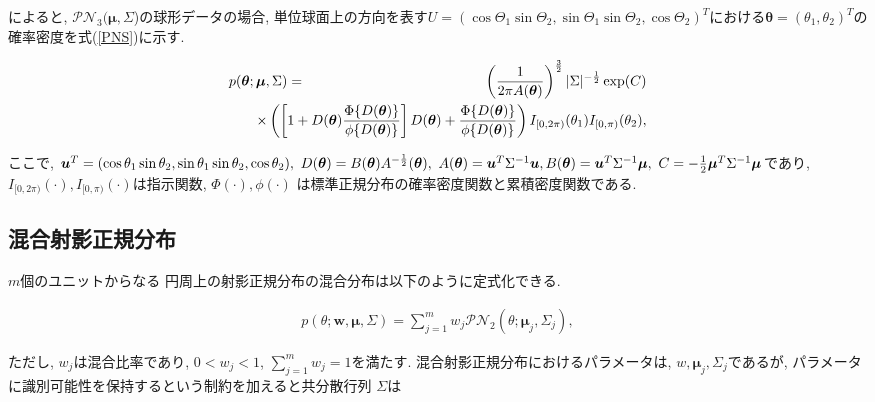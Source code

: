 \documentclass[a4j,12pt]{jarticle}
\begin{document}

\citet{GPN}によると, $\mathcal{PN}_3(\bm \mu,\Sigma$)の球形データの場合, 単位球面上の方向を表す$U = (\cos\Theta_1 \sin \Theta_2, \sin\Theta_1 \sin \Theta_2, \cos \Theta_2)^T$における$\bm \theta = (\theta_1, \theta_2)^T$の確率密度を式(\ref{PNS})に示す.

\begin{eqnarray}
\label{PNS}
p(\bm \theta; \bm \mu, \Sigma) &=& \left(\frac{1}{2\pi A(\bm \theta)}\right)^{\frac{3}{2}} |\Sigma|^{-\frac{1}{2}}
\exp(C) \nonumber \\ 
&& \hspace{-1.5cm} \times \left( \left[1 + D(\bm \theta) \frac{\Phi \{D(\bm \theta)\}}{\phi \{D(\bm \theta)\}} \right] D(\bm \theta) + \frac{\Phi \{D(\bm \theta)\}}{\phi \{D(\bm \theta)\}} \right) I_{[0,2\pi)}(\theta_1) I_{[0,\pi)}(\theta_2),
\end{eqnarray}

\noindent
ここで, $\bm u^T = (\cos\theta_1 \sin \theta_2, \sin\theta_1 \sin \theta_2, \cos \theta_2), 
\ D(\bm \theta) = B(\bm \theta) A^{-\frac{1}{2}}(\bm \theta), \ A(\bm \theta) = \bm u^T \Sigma^{-1} \bm u,\\ B(\bm \theta) = \bm u^T \Sigma^{-1} \bm \mu, \ C = -\frac{1}{2} \bm \mu^T \Sigma^{-1} \bm \mu$であり, $I_{[0,2\pi)} (\cdot), I_{[0,\pi)}(\cdot)$は指示関数, $\Phi(\cdot), \phi(\cdot)$ は標準正規分布の確率密度関数と累積密度関数である.

\subsection{混合射影正規分布}
$m$個のユニットからなる 円周上の射影正規分布の混合分布は以下のように定式化できる. 

\begin{eqnarray*}
\label{MPNC}
p(\theta;\bm w,\bm \mu, \Sigma) = \sum^m_{j=1} w_j \mathcal{PN}_2(\theta;\bm \mu_j, \Sigma_j),
\end{eqnarray*}

\noindent
ただし, $w_j$は混合比率であり, $0 < w_j < 1$, $\sum^m_{j=1} w_j = 1$を満たす. 混合射影正規分布におけるパラメータは, $w, \bm \mu_j, \Sigma_j$であるが, パラメータに識別可能性を保持するという制約を加えると共分散行列 $\Sigma$は
\end{document}
